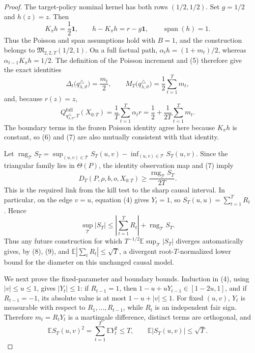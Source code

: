 \documentclass{article}
\begin{document}
\begin{proof}
The target-policy nominal kernel has both rows \((1/2,1/2)\).  Set \(g=1/2\) and \(h(z)=z\).  Then
\[
 K_{\pi}h=\frac12\mathbf 1,\qquad
 h-K_{\pi}h=r-g\mathbf 1,\qquad
 \operatorname{span}(h)=1.
 \tag{5}
\]
Thus the Poisson and span assumptions hold with \(B=1\), and the construction belongs to \(\mathfrak M_{2,2,T}(1/2,1)\).  On a full factual path, \(\alpha_t h=(1+m_t)/2\), whereas \(\alpha_{t-1}K_{\pi}h=1/2\).  The definition of the Poisson increment and (5) therefore give the exact identities
\[
 \Delta_t\bigl(q^{\triangle}_{\lambda,\vartheta}\bigr)=\frac{m_t}{2},
 \qquad
 M_T\bigl(q^{\triangle}_{\lambda,\vartheta}\bigr)=\frac12\sum_{t=1}^Tm_t,
 \tag{6}
\]
and, because \(r(z)=z\),
\[
 Q^{\mathrm{full}}_{q^{\triangle}_{\lambda,\vartheta},T}(X_{0:T})
 =\frac1T\sum_{t=1}^T\alpha_t r
 =\frac12+\frac1{2T}\sum_{t=1}^Tm_t.
 \tag{7}
\]
The boundary terms in the frozen Poisson identity agree here because \(K_{\pi}h\) is constant, so (6) and (7) are also mutually consistent with that identity.

Let \(\operatorname{rng}_{\mathcal T}S_T=\sup_{(u,v)\in\mathcal T}S_T(u,v)-\inf_{(u,v)\in\mathcal T}S_T(u,v)\).  Since the triangular family lies in \(\Theta(P)\), the identity observation map and (7) imply
\[
 D_T(P,\rho,b,o,X_{0:T})
 \geq \frac{\operatorname{rng}_{\mathcal T}S_T}{2T}.
 \tag{8}
\]
This is the required link from the kill test to the sharp causal interval.  In particular, on the edge \(v=u\), equation (4) gives \(Y_t=1\), so \(S_T(u,u)=\sum_{t=1}^TR_t\).  Hence
\[
 \sup_{\mathcal T}|S_T|
 \leq\left|\sum_{t=1}^TR_t\right|+\operatorname{rng}_{\mathcal T}S_T.
 \tag{9}
\]
Thus any future construction for which \(T^{-1/2}\mathbb E\sup_{\mathcal T}|S_T|\) diverges automatically gives, by (8), (9), and \(\mathbb E|\sum_tR_t|\leq\sqrt T\), a divergent root-\(T\)-normalized lower bound for the diameter on this unchanged causal model.

We next prove the fixed-parameter and boundary bounds.  Induction in (4), using \(|v|\leq u\leq1\), gives \(|Y_t|\leq1\): if \(R_{t-1}=1\), then \(1-u+uY_{t-1}\in[1-2u,1]\), and if \(R_{t-1}=-1\), its absolute value is at most \(1-u+|v|\leq1\).  For fixed \((u,v)\), \(Y_t\) is measurable with respect to \(R_1,\ldots,R_{t-1}\), while \(R_t\) is an independent fair sign.  Therefore \(m_t=R_tY_t\) is a martingale difference, distinct terms are orthogonal, and
\[
 \mathbb E S_T(u,v)^2=\sum_{t=1}^T\mathbb EY_t^2\leq T,
 \qquad
 \mathbb E|S_T(u,v)|\leq\sqrt T.
 \tag{10}
\]


\end{proof}
\end{document}

